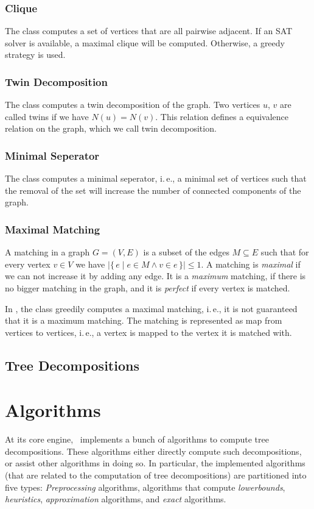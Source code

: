\documentclass[a4paper, ukenglish, twoside, openright]{jdrasilmanual}
\begin{document}
\section{Clique}
The class  computes a set of vertices that are all pairwise adjacent. If an SAT
solver is available, a maximal clique will be computed. Otherwise, a
greedy strategy is used.

\section{Twin Decomposition}
The class  computes a twin decomposition of the graph. Two vertices $u$, $v$ are
called twins if we have $N(u)=N(v)$. This relation defines a
equivalence relation on the graph, which we call twin decomposition.

\section{Minimal Seperator}
The class  computes a minimal seperator, i.\,e., a minimal set of vertices such
that the removal of the set will increase the number of connected
components of the graph.

\section{Maximal Matching}
A matching in a graph \(G=(V,E)\) is a subset of the edges
\(M\subseteq E\) such that for every vertex \(v\in V\) we have
\(|\{\,e\mid e\in M\wedge v\in e\,\}|\leq 1\). A matching is \emph{maximal} if
we can not increase it by adding any edge. It is a \emph{maximum} matching,
if there is no bigger matching in the graph, and it is \emph{perfect} if
every vertex is matched.
  
In \Jdrasil, the class  greedily computes a maximal matching, i.\,e., it is not
guaranteed that it is a maximum matching. The matching is represented
as map from vertices to vertices, i.\,e., a vertex is mapped to the
vertex it is matched with.
  
\chapter{Tree Decompositions}\label{chapter:treedecompositions}

\part{Algorithms}
At its core engine, \Jdrasil\ implements a bunch of algorithms to
compute tree decompositions. These algorithms either directly compute
such decompositions, or assist other algorithms in doing so. In
particular, the implemented algorithms (that are related to the
computation of tree decompositions) are partitioned into five types:
\emph{Preprocessing} algorithms, algorithms that compute
\emph{lowerbounds}, \emph{heuristics}, \emph{approximation}
algorithms, and \emph{exact} algorithms.
\end{document}
